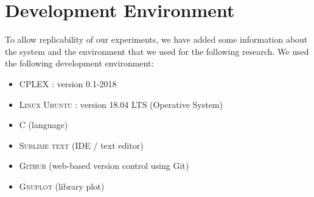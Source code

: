 
\chapter{Development Environment}
\label{chp:1-Environment}
To allow replicability of our experiments, we have added some information about the system and the environment that we used for the following research. 
We used the following development environment:
\begin{itemize}
\item \textsc{CPLEX} :  version 0.1-2018
\item \textsc{Linux Ubuntu} : version 18.04 LTS (Operative System)
\item \textsc{C}  	(language)
\item \textsc{Sublime text} (IDE / text editor)
\item \textsc{Github} (web-based version control using Git)
\item \textsc{Gnuplot} (library plot)
\end{itemize}


